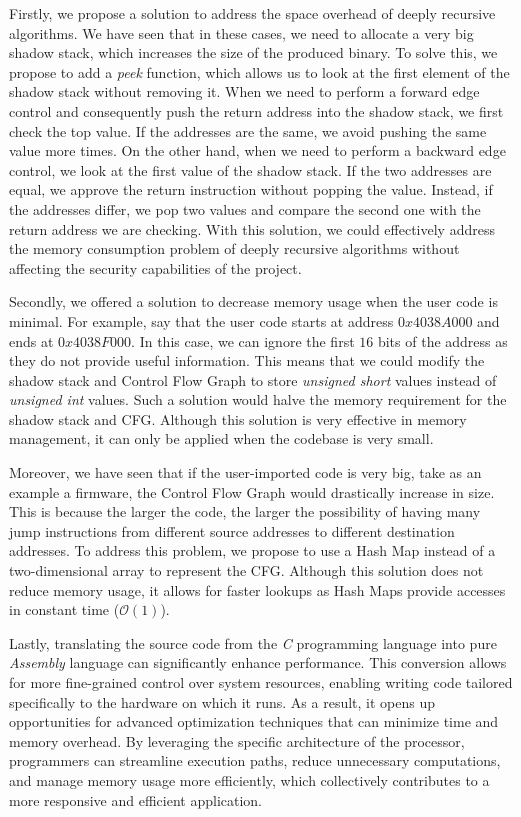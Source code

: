 Firstly, we propose a solution to address the space overhead of deeply recursive
algorithms. We have seen that in these cases, we need to allocate a very big shadow
stack, which increases the size of the produced binary. To solve this, we
propose to add a \textit{peek} function, which allows us to look at the first
element of the shadow stack without removing it. When we need to perform a forward
edge control and consequently push the return address into the shadow stack, we
first check the top value. If the addresses are the same, we avoid pushing the
same value more times. On the other hand, when we need to perform a backward
edge control, we look at the first value of the shadow stack. If the two
addresses are equal, we approve the return instruction without popping the value.
Instead, if the addresses differ, we pop two values and compare the second one
with the return address we are checking. With this solution, we could
effectively address the memory consumption problem of deeply recursive
algorithms without affecting the security capabilities of the project.

Secondly, we offered a solution to decrease memory usage when the user code is minimal.
For example, say that the user code starts at address $0x4038A000$ and ends at $0
x4038F000$. In this case, we can ignore the first $16$ bits of the address as they
do not provide useful information. This means that we could modify the shadow
stack and Control Flow Graph to store \textit{unsigned short} values instead of \textit{unsigned
int} values. Such a solution would halve the memory requirement for the shadow stack
and CFG. Although this solution is very effective in memory management, it can only
be applied when the codebase is very small.

Moreover, we have seen that if the user-imported code is very big, take as an example
a firmware, the Control Flow Graph would drastically increase in size. This is because
the larger the code, the larger the possibility of having many jump instructions
from different source addresses to different destination addresses. To address this
problem, we propose to use a Hash Map instead of a two-dimensional array to
represent the CFG. Although this solution does not reduce memory usage, it
allows for faster lookups as Hash Maps provide accesses in constant time ($\mathcal{O}
(1)$).

Lastly, translating the source code from the \textit{C} programming language
into pure \textit{Assembly} language can significantly enhance performance. This
conversion allows for more fine-grained control over system resources, enabling writing
code tailored specifically to the hardware on which it runs. As a result, it opens
up opportunities for advanced optimization techniques that can minimize time and
memory overhead. By leveraging the specific architecture of the processor, programmers
can streamline execution paths, reduce unnecessary computations, and manage memory
usage more efficiently, which collectively contributes to a more responsive and
efficient application.

